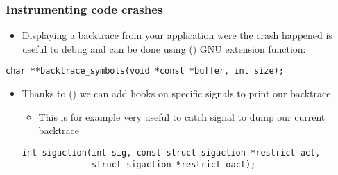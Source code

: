 \begin{frame}[fragile]
  \frametitle{Instrumenting code crashes}
  \begin{itemize}
      \item Displaying a backtrace from your application were the crash happened
            is useful to debug and can be done using 
            () GNU extension function:
  \end{itemize}
    \begin{block}{}
      \begin{verbatim}
char **backtrace_symbols(void *const *buffer, int size);
      \end{verbatim}
    \end{block}

  \begin{itemize}
	  \item Thanks to  ()
          we can add hooks on specific signals to print our backtrace
    \begin{itemize}
      \item This is for example very useful to catch  signal to dump our current backtrace
    \end{itemize}
    \begin{block}{}
      \begin{verbatim}
int sigaction(int sig, const struct sigaction *restrict act,
              struct sigaction *restrict oact);
      \end{verbatim}
    \end{block}
  \end{itemize}
\end{frame}

